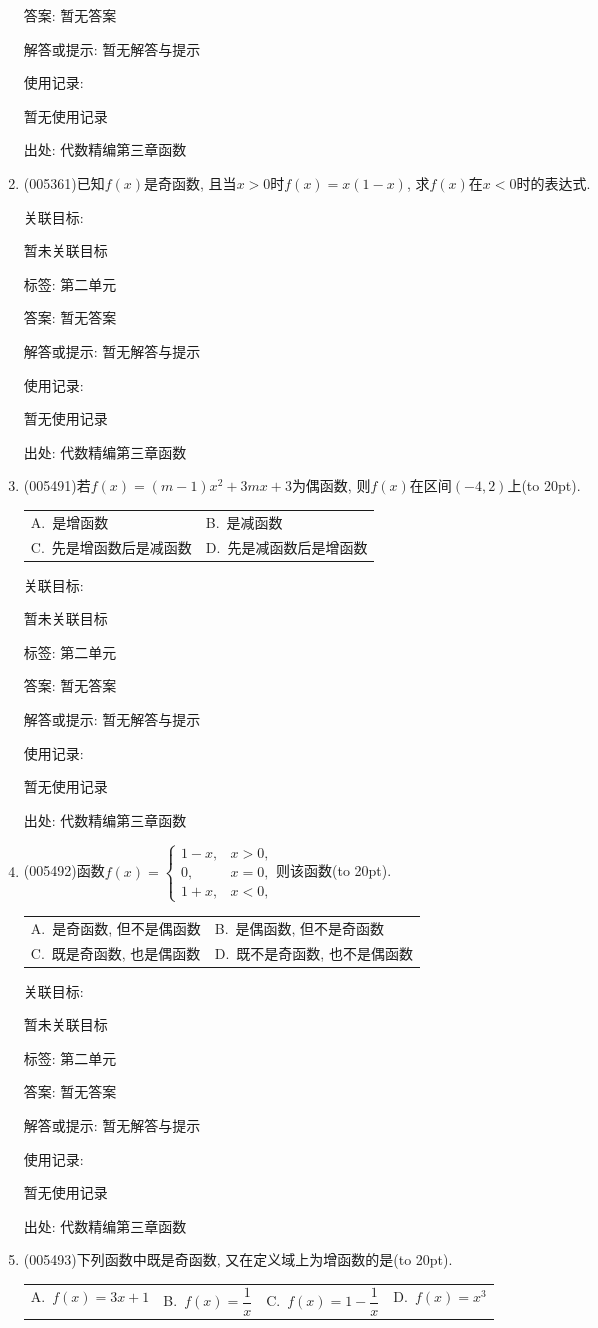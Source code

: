\documentclass[10pt,a4paper]{article}
\newcommand{\bracket}[1]{(\hbox to #1pt{})}
\newcommand{\twoch}[4]{\par\begin{tabular}{p{.46\textwidth}p{.46\textwidth}}
A.~#1& B.~#2\\
C.~#3& D.~#4
\end{tabular}}
\newcommand{\fourch}[4]{\par\begin{tabular}{p{.23\textwidth}p{.23\textwidth}p{.23\textwidth}p{.23\textwidth}}
A.~#1 &B.~#2& C.~#3& D.~#4
\end{tabular}}
\begin{document}
\begin{enumerate}[1.]
答案: 暂无答案

解答或提示: 暂无解答与提示

使用记录:

暂无使用记录


出处: 代数精编第三章函数
\item { (005361)}已知$f(x)$是奇函数, 且当$x>0$时$f(x)=x(1-x)$, 求$f(x)$在$x<0$时的表达式.


关联目标:

暂未关联目标



标签: 第二单元

答案: 暂无答案

解答或提示: 暂无解答与提示

使用记录:

暂无使用记录


出处: 代数精编第三章函数
\item { (005491)}若$f(x)=(m-1)x^2+3mx+3$为偶函数, 则$f(x)$在区间$(-4,2)$上\bracket{20}.
\twoch{是增函数}{是减函数}{先是增函数后是减函数}{先是减函数后是增函数}


关联目标:

暂未关联目标



标签: 第二单元

答案: 暂无答案

解答或提示: 暂无解答与提示

使用记录:

暂无使用记录


出处: 代数精编第三章函数
\item { (005492)}函数$f(x)=\begin{cases}   1-x, & x>0,  \\ 0, & x=0,  \\1+x, & x<0,  \end{cases}$则该函数\bracket{20}.
\twoch{是奇函数, 但不是偶函数}{是偶函数, 但不是奇函数}{既是奇函数, 也是偶函数}{既不是奇函数, 也不是偶函数}


关联目标:

暂未关联目标



标签: 第二单元

答案: 暂无答案

解答或提示: 暂无解答与提示

使用记录:

暂无使用记录


出处: 代数精编第三章函数
\item { (005493)}下列函数中既是奇函数, 又在定义域上为增函数的是\bracket{20}.
\fourch{$f(x)=3x+1$}{$f(x)=\dfrac 1x$}{$f(x)=1-\dfrac 1x$}{$f(x)=x^3$}



\end{enumerate}
\end{document}
